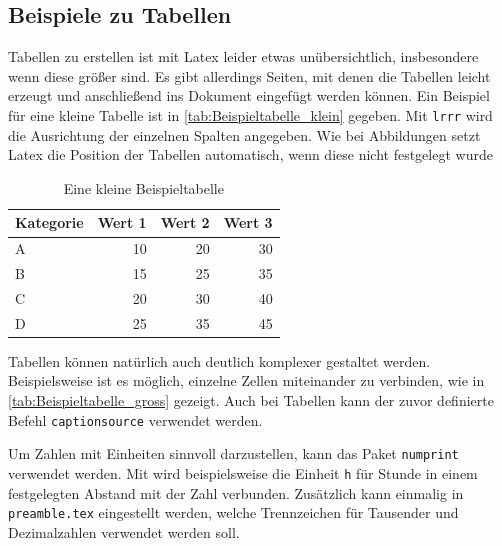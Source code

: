 \subsection{Beispiele zu Tabellen}\label{sec:Tabellen}
Tabellen zu erstellen ist mit Latex leider etwas unübersichtlich, insbesondere wenn diese größer sind. Es gibt allerdings Seiten, mit denen die Tabellen leicht erzeugt und anschließend ins Dokument eingefügt werden können. Ein Beispiel für eine kleine Tabelle ist in \autoref{tab:Beispieltabelle_klein} gegeben. Mit \texttt{lrrr} wird die Ausrichtung der einzelnen Spalten angegeben. Wie bei Abbildungen setzt Latex die Position der Tabellen automatisch, wenn diese nicht festgelegt wurde

\begin{table}
    \centering
    \begin{tabular}{lrrr}
        \toprule
        \textbf{Kategorie} & \textbf{Wert 1} & \textbf{Wert 2} & \textbf{Wert 3} \\ 
        \hline
        A & 10 & 20 & 30 \\ 
        B & 15 & 25 & 35 \\ 
        C & 20 & 30 & 40 \\ 
        D & 25 & 35 & 45 \\ 
        \bottomrule
    \end{tabular}
    \caption{Eine kleine Beispieltabelle}
    \label{tab:Beispieltabelle_klein}
\end{table}

Tabellen können natürlich auch deutlich komplexer gestaltet werden. Beispielsweise ist es möglich, einzelne Zellen miteinander zu verbinden, wie in \autoref{tab:Beispieltabelle_gross} gezeigt. Auch bei Tabellen kann der zuvor definierte Befehl \texttt{captionsource} verwendet werden. 

Um Zahlen mit Einheiten sinnvoll darzustellen, kann das Paket \texttt{numprint} verwendet werden. Mit  wird beispielsweise die Einheit \texttt{h} für Stunde in einem festgelegten Abstand mit der Zahl verbunden. Zusätzlich kann einmalig in \texttt{preamble.tex} eingestellt werden, welche Trennzeichen für Tausender und Dezimalzahlen verwendet werden soll. 

